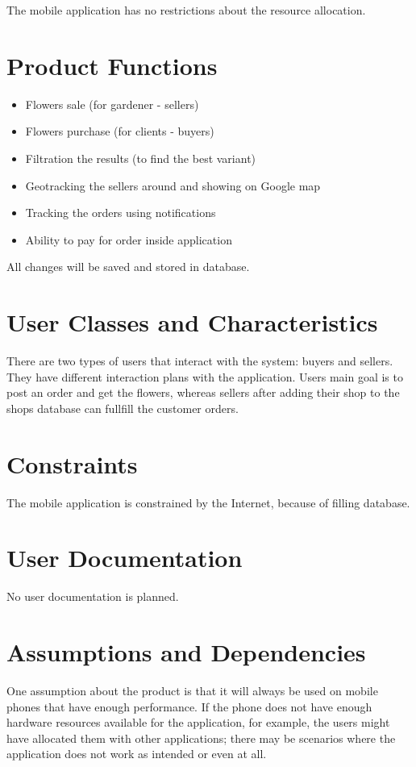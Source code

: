 \documentclass{scrreprt}
\begin{document}
The mobile application has no restrictions about the resource allocation.

\section{Product Functions}
\begin{itemize}
\item Flowers sale (for gardener - sellers)
\item Flowers purchase (for clients - buyers)
\item Filtration the results (to find the best variant)
\item Geotracking the sellers around and showing on Google map
\item Tracking the orders using notifications
\item Ability to pay for order inside application
\end{itemize}

All changes will be saved and stored in database.  

\section{User Classes and Characteristics}
There are two types of users that interact with the system: buyers and sellers. They have different interaction plans with the application. Users main goal is to post an order and get the flowers, whereas sellers after adding their shop to the shops database can fullfill the customer orders. 

\section{Constraints}
The mobile application is constrained by the Internet, because of filling database. 

\section{User Documentation}
No user documentation is planned.

\section{Assumptions and Dependencies}

One assumption about the product is that it will always be used on mobile phones that have enough performance. If the phone does not have enough hardware resources available for the application, for example, the users might have allocated them with other applications; there may be scenarios where the application does not work as intended or even at all.
\end{document}
